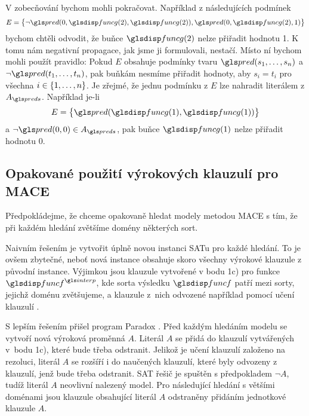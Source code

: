 V zobecňování bychom mohli pokračovat. Například
z následujících podmínek
\[
  E = \bigl\{ \neg \pred(0, \funcG(2), \funcG(2)),
              \pred(0, \funcG(2), 1) \bigr\}
\]
bychom chtěli odvodit, že buňce $\funcG(2)$ nelze přiřadit hodnotu 1.
K tomu nám negativní propagace, jak jsme ji formulovali, nestačí.
Místo ní bychom mohli použít pravidlo:
Pokud $E$ obsahuje
podmínky tvaru $\pred(s_1 \comdots s_n)$
a $\neg \pred(t_1 \comdots t_n)$, pak buňkám nesmíme přiřadit
hodnoty, aby $s_i = t_i$ pro všechna $i \in \{ 1 , \ldots, n \}$.
Je zřejmé, že jednu podmínku z $E$ lze nahradit
literálem z $A_\preds$. Například je-li
\[
  E = \bigl\{ \pred(\funcG(1), \funcG(1)) \bigr\}
\]
a $\neg \pred(0, 0) \in A_\preds$, pak buňce $\funcG(1)$
nelze přiřadit hodnotu 0.

%


\subsection{Opakované použití výrokových klauzulí pro MACE}

Předpokládejme, že chceme opakovaně hledat modely metodou MACE
s tím, že při každém hledání zvětšíme domény některých sort.

Naivním řešením je vytvořit úplně novou instanci SATu pro každé hledání.
To je ovšem zbytečné, neboť nová instance obsahuje skoro
všechny výrokové klauzule z původní instance. Výjimkou
jsou klauzule vytvořené v bodu 1c) pro funkce $\func^\interp$,
kde sorta výsledku $\func$ patří mezi sorty, jejichž doménu zvětšujeme,
a klauzule z~nich odvozené například pomocí učení klauzulí
\cite{silva1997grasp}.

S lepším řešením přišel program Paradox \cite{claessen03paradox}.
Před každým hledáním modelu se vytvoří nová výroková proměnná $A$.
Literál $A$ se přidá do klauzulí vytvářených v~bodu 1c), které
bude třeba odstranit. Jelikož je učení klauzulí založeno na rezoluci,
literál $A$ se rozšíří i do naučených klauzulí, které byly
odvozeny z klauzulí, jenž bude třeba odstranit.
SAT řešič je spuštěn s předpokladem $\neg A$,
tudíž literál $A$ neovlivní nalezený model.
Pro následující hledání s většími doménami jsou klauzule obsahující
literál $A$ odstraněny přidáním jednotkové klauzule $A$.

